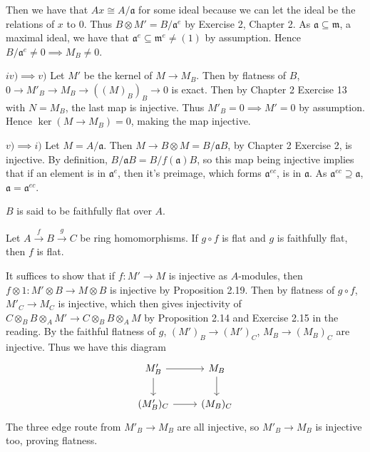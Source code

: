 \documentclass[a4paper]{exam}
\begin{document}
\begin{questions}
\begin{solution}
	Then we have that $Ax \cong A / \mathfrak{a} $ for some ideal because we can let the ideal be the relations of $x $ to 0.
	Thus $B \otimes M' = B / \mathfrak{a}^e $ by Exercise 2, Chapter 2.
	As $\mathfrak{a}\subseteq \mathfrak{m} $, a maximal ideal, we have that $\mathfrak{a}^e \subseteq \mathfrak{m}^e \ne (1) $ by assumption.
	Hence $B / \mathfrak{a}^e \ne 0 \implies M_B \ne 0$.

	$iv) \implies v) $ Let $M' $ be the kernel of $M \to M_B $.
	Then by flatness of $B $, $0\to M'_B \to M_B \to ((M)_B)_B \to 0 $ is exact.
	Then by Chapter 2 Exercise 13 with $N = M_B $, the last map is injective.
	Thus $M'_B = 0 \implies M' = 0 $ by assumption.
	Hence $\ker (M\to M_B) = 0 $, making the map injective.

	$v)\implies i) $ Let $M = A / \mathfrak{a} $.
	Then $M \to B \otimes M = B / \mathfrak{a}B $, by Chapter 2 Exercise 2, is injective.
	By definition, $B / \mathfrak{a}B = B / f(\mathfrak{a})B $, so this map being injective implies that if an element is in $\mathfrak{a}^e $, then it's preimage, which forms $\mathfrak{a}^{ec} $, is in $\mathfrak{a} $.
	As $\mathfrak{a}^{ec} \supseteq \mathfrak{a} $, $\mathfrak{a} = \mathfrak{a}^{ec} $.
\end{solution}
$B $ is said to be faithfully flat over $A $.

\question Let $A\xrightarrow{f} B \xrightarrow{g} C $ be ring homomorphisms. If $g\circ f $ is flat and $g $ is faithfully flat, then $f $ is flat.
\begin{solution}
	It suffices to show that if $f: M'\to M$ is injective as $A $-modules, then $f \otimes 1: M' \otimes B\to M \otimes B $ is injective by Proposition 2.19.
	Then by flatness of $g\circ f $, $M'_C \to M_C$ is injective, which then gives injectivity of $C \otimes _B B \otimes _A M' \to C \otimes _B B \otimes_A M$ by Proposition 2.14 and Exercise 2.15 in the reading.
	By the faithful flatness of $g $, $(M')_B \to (M')_C $, $M_B\to (M_B)_C $ are injective.
	Thus we have this diagram
	\[
	\begin{tikzcd}
	 M'_B & M_B\\
	 (M'_B)_C & (M_B)_C
	\arrow[from=1-1,to=1-2]
	\arrow[from=1-1,to=2-1]
	\arrow[from=2-1,to=2-2]
	\arrow[from=1-2,to=2-2]
	\end{tikzcd}
	\]
	The three edge route from $M'_B\to M_B $ are all injective, so $M'_B\to M_B $ is injective too, proving flatness.
\end{solution}


\end{questions}
\end{document}
